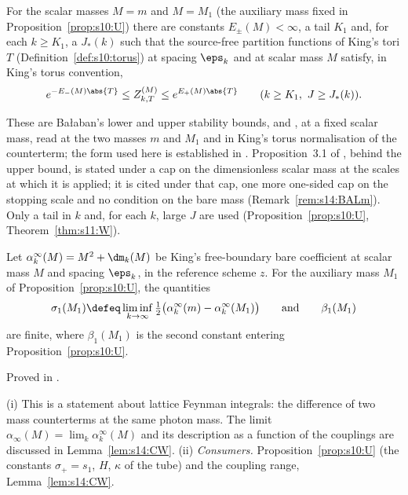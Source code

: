 \begin{proposition}\label{hyp:s03:T1}
For the scalar masses $M=m$ and $M=M_1$ (the auxiliary mass fixed in Proposition~\ref{prop:s10:U}) there are constants $E_\pm(M)<\infty$, a tail $K_1$ and, for each $k\ge K_1$, a $J_*(k)$ such that the source-free partition functions of King's tori $T$ (Definition~\ref{def:s10:torus}) at spacing $\eps_k$ and at scalar mass $M$ satisfy, in King's torus convention,
\[
e^{-E_-(M)\abs{T}}\le Z^{(M)}_{k,T}\le e^{E_+(M)\abs{T}}\qquad(k\ge K_1,\ J\ge J_*(k)).
\]
\end{proposition}
These are Ba{\l}aban's lower and upper stability bounds, \cite[(1.14)]{Ba1} and \cite[(1.3)]{Ba2}, at a fixed scalar mass, read at the two masses $m$ and $M_1$ and in King's torus normalisation of the counterterm; the form used here is established in . Proposition~3.1 of \cite{Ba2}, behind the upper bound, is stated under a cap on the dimensionless scalar mass at the scales at which it is applied; it is cited under that cap, one more one-sided cap on the stopping scale and no condition on the bare mass (Remark~\ref{rem:s14:BALm}). Only a tail in $k$ and, for each $k$, large $J$ are used (Proposition~\ref{prop:s10:U}, Theorem~\ref{thm:s11:W}).

\begin{lemma}\label{hyp:s03:T2}
Let $\alpha^\infty_k(M)=M^2+\dm_k(M)$ be King's free-boundary bare coefficient at scalar mass $M$ and spacing $\eps_k$, in the reference scheme $z$. For the auxiliary mass $M_1$ of Proposition~\ref{prop:s10:U}, the quantities
\[
\sigma_1(M_1)\defeq\liminf_{k\to\infty}\tfrac12\bigl(\alpha^\infty_k(m)-\alpha^\infty_k(M_1)\bigr)
\qquad\text{and}\qquad \beta_1(M_1)
\]
are finite, where $\beta_1(M_1)$ is the second constant entering Proposition~\ref{prop:s10:U}.
\end{lemma}
Proved in .

\begin{remark}\label{rem:s03:T2}
(i) This is a statement about lattice Feynman integrals: the difference of two mass counterterms at the same photon mass. The limit $\alpha_\infty(M)=\lim_k\alpha^\infty_k(M)$ and its description as a function of the couplings are discussed in Lemma~\ref{lem:s14:CW}.
(ii) \emph{Consumers.} Proposition~\ref{prop:s10:U} (the constants $\sigma_+=s_1$, $H$, $\kappa$ of the tube) and the coupling range, Lemma~\ref{lem:s14:CW}.
\end{remark}

